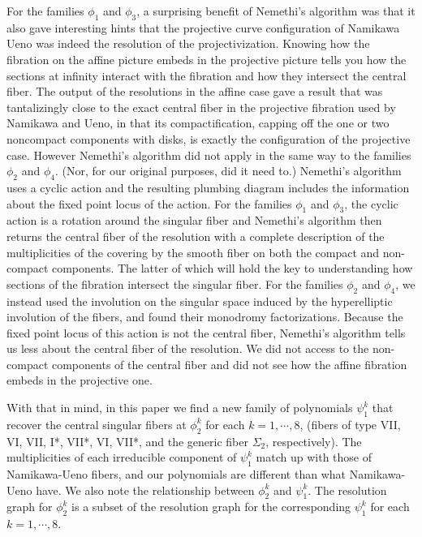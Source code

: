 \documentclass[11pt,letterpaper,reqno]{amsart}
\theoremstyle{remark}
\begin{document}
For the families $\phi_1$ and $\phi_3$, a surprising benefit of Nemethi's algorithm was that it also gave interesting hints that the projective curve configuration of Namikawa Ueno was indeed the resolution of the projectivization. Knowing how the fibration on the affine picture embeds in the projective picture tells you how the sections at infinity interact with the fibration and how they intersect the central fiber. The output of the resolutions in the affine case gave a result that was tantalizingly close to the exact central fiber in the projective fibration used by Namikawa and Ueno, in that its compactification, capping off the one or two noncompact components with disks, is exactly the configuration of the projective case. However Nemethi's algorithm did not apply in the same way to the families $\phi_2$ and $\phi_4$. (Nor, for our original purposes, did it need to.) Nemethi's algorithm uses a cyclic action and the resulting plumbing diagram includes the information about the fixed point locus of the action. For the families $\phi_1$ and $\phi_3$, the cyclic action is a rotation around the singular fiber and Nemethi's algorithm then returns the central fiber of the resolution with a complete description of the multiplicities of the covering by the smooth fiber on both the compact and non-compact components. The latter of which will hold the key to understanding how sections of the fibration intersect the singular fiber. For the families $\phi_2$ and $\phi_4$, we instead used the involution on the singular space induced by the hyperelliptic involution of the fibers, and found their monodromy factorizations. Because the fixed point locus of this action is not the central fiber, Nemethi's algorithm tells us less about the central fiber of the resolution. We did not access to the non-compact components of the central fiber and did not see how the affine fibration embeds in the projective one.

With that in mind, in this paper we find a new family of polynomials $\psi_1^k$ that recover the central singular fibers at $\phi_2^k$ for each $k=1, \cdots, 8$, (fibers of type VII, VI, VII, I*, VII*, VI, VII*, and the generic fiber $\Sigma_2$, respectively). The multiplicities of each irreducible component of $\psi_1^k$ match up with those of Namikawa-Ueno fibers, and our polynomials are different than what Namikawa-Ueno have. We also note the relationship between $\phi_2^k$ and $\psi_1^k$. The resolution graph for $\phi_2^k$ is a subset of the resolution graph for the corresponding $\psi_1^k$ for each $k=1, \cdots, 8$.
\end{document}
